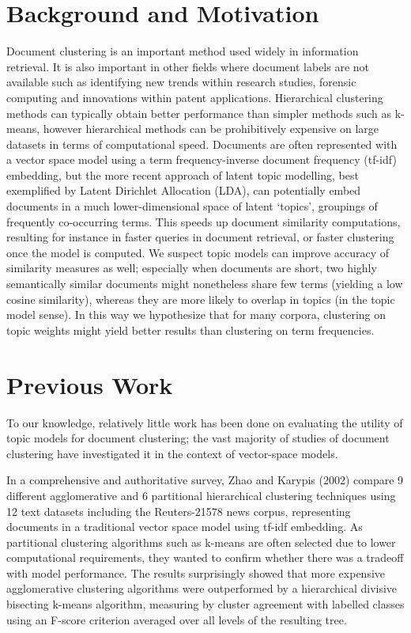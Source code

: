 \documentclass{sig-alternate-05-2015}
\begin{document}
\section{Background and Motivation}
Document clustering is an important method used widely in information retrieval. It is also important in other fields where document labels are not available such as identifying new trends within research studies, forensic computing and innovations within patent applications. Hierarchical clustering methods can typically obtain better performance than simpler methods such as k-means, however hierarchical methods can be prohibitively expensive on large datasets in terms of computational speed. Documents are often represented with a vector space model using a term frequency-inverse document frequency (tf-idf) embedding, but the more recent approach of latent topic modelling, best exemplified by Latent Dirichlet Allocation (LDA)\cite{LDA}, can potentially embed documents in a much lower-dimensional space of latent `topics', groupings of frequently co-occurring terms.  This speeds up document similarity computations, resulting for instance in faster queries in document retrieval, or faster clustering once the model is computed.  We suspect topic models can improve accuracy of similarity measures as well; especially when documents are short, two highly semantically similar documents might nonetheless share few terms (yielding a low cosine similarity), whereas they are more likely to overlap in topics (in the topic model sense).  In this way we hypothesize that for many corpora, clustering on topic weights might yield better results than clustering on term frequencies.


\section{Previous Work}
To our knowledge, relatively little work has been done on evaluating the utility of topic models for document clustering; the vast majority of studies of document clustering have investigated it in the context of vector-space models.

\par
In a comprehensive and authoritative survey, Zhao and Karypis (2002)\cite{clustersurvey} compare 9 different agglomerative and 6 partitional hierarchical clustering techniques using 12 text datasets including the Reuters-21578 news corpus, representing documents in a traditional vector space model using tf-idf embedding. As partitional clustering algorithms such as k-means are often selected due to lower computational requirements, they wanted to confirm whether there was a tradeoff with model performance. The results surprisingly showed that more expensive agglomerative clustering algorithms were outperformed by a hierarchical divisive bisecting k-means algorithm, measuring by cluster agreement with labelled classes using an F-score criterion averaged over all levels of the resulting tree.
\end{document}
